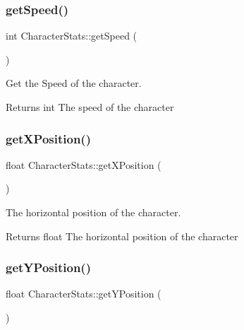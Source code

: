 \subsubsection{\texorpdfstring{getSpeed()}{getSpeed()}}
{\footnotesize\ttfamily int Character\+Stats\+::get\+Speed (\begin{DoxyParamCaption}{ }\end{DoxyParamCaption})\hspace{0.3cm}{\ttfamily [inline]}}



Get the Speed of the character. 

\begin{DoxyReturn}{Returns}
int The speed of the character 
\end{DoxyReturn}
\mbox{\label{classCharacterStats_afb86511575622311cfe30efeff513e6f}} 
\subsubsection{\texorpdfstring{getXPosition()}{getXPosition()}}
{\footnotesize\ttfamily float Character\+Stats\+::get\+X\+Position (\begin{DoxyParamCaption}{ }\end{DoxyParamCaption})\hspace{0.3cm}{\ttfamily [inline]}}



The horizontal position of the character. 

\begin{DoxyReturn}{Returns}
float The horizontal position of the character 
\end{DoxyReturn}
\mbox{\label{classCharacterStats_ac8669b2ea74ea7a712463f9f2e0d05c8}} 
\subsubsection{\texorpdfstring{getYPosition()}{getYPosition()}}
{\footnotesize\ttfamily float Character\+Stats\+::get\+Y\+Position (\begin{DoxyParamCaption}{ }\end{DoxyParamCaption})\hspace{0.3cm}{\ttfamily [inline]}}



